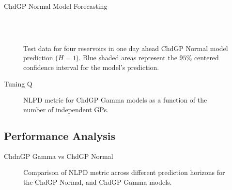 \begin{frame}{ChdGP Normal Model Forecasting}
	\justifying
	\begin{figure}[htbp]
		\setlength{} 
		\setlength{}
		
		\subfloat[$T.$]{}\hfill
		\subfloat[$A.$]{}\\[-0.5cm]
		\subfloat[$I.$]{}\hfill
		\subfloat[$O.$]{}\\[-0.4cm]
		
		\caption{Test data for four reservoirs in one day ahead ChdGP Normal model prediction ($H=1$). Blue shaded areas represent the $95\%$ centered confidence interval for the model's prediction.}
	\end{figure}
\end{frame}

\begin{frame}{Tuning Q}
	\begin{figure}[htbp]
		\centering
		\setlength\figurewidth{\columnwidth} 
		\setlength{}
		
		\caption{NLPD metric for ChdGP Gamma models as a function of the number of independent GPs.}
	\end{figure}
\end{frame}

\subsection{Performance Analysis}

\begin{frame}{ChdnGP Gamma vs ChdGP Normal}
	\begin{figure}[htbp]
		\centering
		\setlength\figurewidth{\columnwidth} 
		\setlength{}
		
		\caption{Comparison of NLPD metric across different prediction horizons for the ChdGP Normal, and ChdGP Gamma models.}
	\end{figure}
	
\end{frame}

